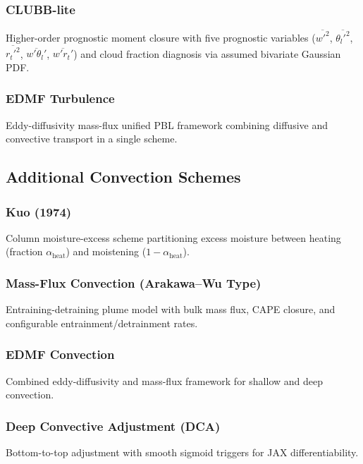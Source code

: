 \documentclass[11pt,a4paper]{article}
\begin{document}
\subsubsection{CLUBB-lite}
Higher-order prognostic moment closure with five prognostic variables ($\overline{w'^2}$, $\overline{\theta_l'^2}$, $\overline{r_t'^2}$, $\overline{w'\theta_l'}$, $\overline{w'r_t'}$) and cloud fraction diagnosis via assumed bivariate Gaussian PDF.

\subsubsection{EDMF Turbulence}
Eddy-diffusivity mass-flux unified PBL framework combining diffusive and convective transport in a single scheme.

\subsection{Additional Convection Schemes}

\subsubsection{Kuo (1974)}
Column moisture-excess scheme partitioning excess moisture between heating (fraction $\alpha_{\mathrm{heat}}$) and moistening ($1-\alpha_{\mathrm{heat}}$).

\subsubsection{Mass-Flux Convection (Arakawa--Wu Type)}
Entraining-detraining plume model with bulk mass flux, CAPE closure, and configurable entrainment/detrainment rates.

\subsubsection{EDMF Convection}
Combined eddy-diffusivity and mass-flux framework for shallow and deep convection.

\subsubsection{Deep Convective Adjustment (DCA)}
Bottom-to-top adjustment with smooth sigmoid triggers for JAX differentiability.
\end{document}
